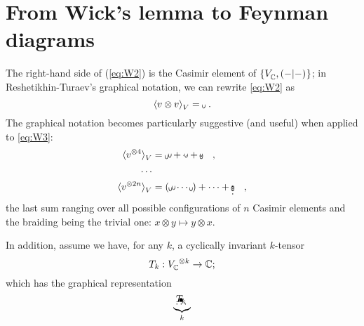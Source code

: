 \section{From Wick's lemma to Feynman diagrams}
\label{sec:wick-to-fd}

The right-hand side of (\ref{eq:W2}) is the Casimir element of
$\{V^{}_{\mathbb{C}}, ( -|- )_{}\}$; in Reshetikhin-Turaev's graphical
notation, we can rewrite \eqref{eq:W2} as
\begin{equation*}
  \avg{v\otimes v}= {\xy\vloop-\endxy}\ .
\end{equation*}
The graphical notation becomes particularly suggestive 
(and useful) when applied to \eqref{eq:W3}:
\begin{equation}
  \label{eq:avg-to-casimir}
  \begin{split}
    \avg{v\tp{ 4}} &=
    {%
      {\xy\vloop-,(1.2,0.5),\vloop-\endxy} +
      {\xy\vloop-|(.7)\knothole,(0.5,0.5),\vloop-\endxy} + 
      {\xy\vloop-,(0.7,0):(0.2,0.7),\vloop-\endxy}
    }\quad, \\
    \ldots& \\
    \avg{v\tp{ 2n}} &=
    {%
      \left({\xy\vloop-,(1.2,0.5),\vloop-,(1.2,0)\endxy} \cdots
        {\xy\vloop-\endxy}\right) +
      \dots +
      {\xy\vloop-,(0.7,0):(0.2,0.7),%
        \vloop-,(0.7,0.2)*\txt{\vdots},(0.24,0):(2.4,2.9)\vloop-\endxy}
      }\quad,
  \end{split}
\end{equation}
the last sum ranging over all possible configurations of $n$ Casimir
elements and the braiding being the trivial one: $x\otimes y\mapsto
y\otimes x$.  

In addition, assume we have, for any $k$, a cyclically invariant
$k$-tensor
\begin{equation*}
  T_{k}:V^{}_{\mathbb{C}}{}\sp{\otimes k} \to \mathbb{C};
\end{equation*}
which has the graphical representation
\begin{equation*}
  \underbrace{\xy(0.3333,0):
    (0,0)="a",
    (2,0)="b",
    (4,0)="c",
    (6,0)="d",
    (3,4)="v",
    (3,5)="w",
    "v";"a"**\dir{-},
    "v";"b"**\dir{-},
    "v";"d"**\dir{-},
    "c"*\txt{\ldots},
    "w"*\txt{$T_{k}$},
    "v"*{\bullet}
    \endxy}_{k}
\end{equation*}

